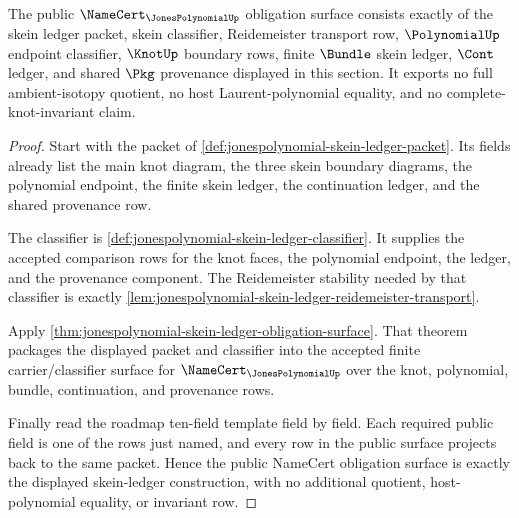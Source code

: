 \begin{theorem}
\label{thm:jonespolynomial-namecert-obligation-surface}
The public $\NameCert_{\JonesPolynomialUp}$ obligation surface consists exactly
of the skein ledger packet, skein classifier, Reidemeister transport row,
$\PolynomialUp$ endpoint classifier, $\KnotUp$ boundary rows, finite $\Bundle$
skein ledger, $\Cont$ ledger, and shared $\Pkg$ provenance displayed in this
section. It exports no full ambient-isotopy quotient, no host
Laurent-polynomial equality, and no complete-knot-invariant claim.
\end{theorem}
\begin{proof}
Start with the packet of
\autoref{def:jonespolynomial-skein-ledger-packet}. Its fields already list the
main knot diagram, the three skein boundary diagrams, the polynomial endpoint,
the finite skein ledger, the continuation ledger, and the shared provenance
row.

The classifier is
\autoref{def:jonespolynomial-skein-ledger-classifier}. It supplies the accepted
comparison rows for the knot faces, the polynomial endpoint, the ledger, and
the provenance component. The Reidemeister stability needed by that classifier
is exactly \autoref{lem:jonespolynomial-skein-ledger-reidemeister-transport}.

Apply
\autoref{thm:jonespolynomial-skein-ledger-obligation-surface}. That theorem
packages the displayed packet and classifier into the accepted finite
carrier/classifier surface for $\NameCert_{\JonesPolynomialUp}$ over the knot,
polynomial, bundle, continuation, and provenance rows.

Finally read the roadmap ten-field template field by field. Each required
public field is one of the rows just named, and every row in the public surface
projects back to the same packet. Hence the public NameCert obligation surface
is exactly the displayed skein-ledger construction, with no additional quotient,
host-polynomial equality, or invariant row.
\end{proof}


